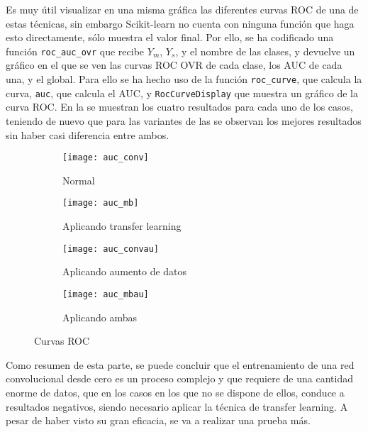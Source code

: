 				Es muy útil visualizar en una misma gráfica las diferentes curvas ROC de una de estas técnicas, sin embargo Scikit-learn no cuenta con ninguna función que haga esto directamente, sólo muestra el valor final. Por ello, se ha codificado una función \texttt{roc\_auc\_ovr} que recibe $Y_m$, $Y_s$, y el nombre de las clases, y devuelve un gráfico en el que se ven las curvas ROC OVR de cada clase, los AUC de cada una, y el global. Para ello se ha hecho uso de la función \texttt{roc\_curve}, que calcula la curva, \texttt{auc}, que calcula el AUC, y \texttt{RocCurveDisplay} que muestra un gráfico de la curva ROC. En la  se muestran los cuatro resultados para cada uno de los casos, teniendo de nuevo que para las variantes de las  se observan los mejores resultados sin haber casi diferencia entre ambos. \\
				
				\begin{figure}[!h]
					\centering
					\begin{subfigure}{.4\textwidth}
						\centering
						\texttt{[image: auc\_conv]}
						\caption{Normal}
						\label{fig:roc_conv}
					\end{subfigure}\hfill
					\begin{subfigure}{.4\textwidth}
						\centering
						\texttt{[image: auc\_mb]}
						\caption{Aplicando transfer learning}
						\label{fig:roc_mb}
					\end{subfigure}
					\begin{subfigure}{.4\textwidth}
						\centering
						\texttt{[image: auc\_convau]}
						\caption{Aplicando aumento de datos}
						\label{fig:roc_convau}
					\end{subfigure}\hfill
					\begin{subfigure}{.4\textwidth}
						\centering
						\texttt{[image: auc\_mbau]}
						\caption{Aplicando ambas}
						\label{fig:roc_mbau}
					\end{subfigure}
					\caption{Curvas ROC}
					\label{fig:roc}
				\end{figure}
			
				Como resumen de esta parte, se puede concluir que el entrenamiento de una red convolucional desde cero es un proceso complejo y que requiere de una cantidad enorme de datos, que en los casos en los que no se dispone de ellos, conduce a resultados negativos, siendo necesario aplicar la técnica de transfer learning. A pesar de haber visto su gran eficacia, se va a realizar una prueba más. \\
				
